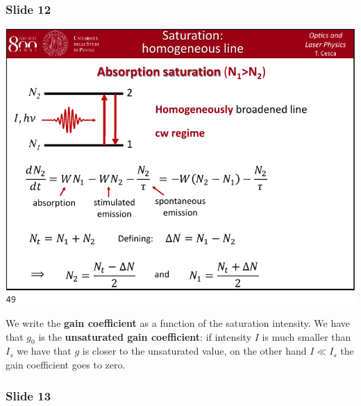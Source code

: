 \documentclass[../main/main.tex]{subfiles}
\begin{document}
\subsubsection*{Slide 12}

\begin{minipage}[]{0.5\linewidth}
\centering
\includegraphics[page=12,width=1\textwidth]{../lessons/pdf_file/10_lecture.pdf}
\end{minipage}
\hspace{0.3cm}\vspace{0.3cm}
\begin{minipage}[c]{0.47\linewidth}

We write the \textbf{gain coefficient} as a function of the saturation intensity. We have that \( g_0 \) is the \textbf{unsaturated gain coefficient}: if intensity \( I \) is much smaller than \( I_s \) we have that \( g \) is closer to the unsaturated value, on the other hand \( I \ll I_s \) the gain coefficient goes to zero.

\end{minipage}

\subsubsection*{Slide 13}
\end{document}
